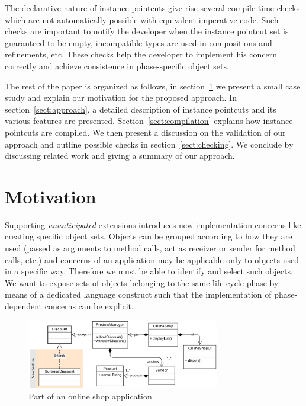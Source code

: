 The declarative nature of instance pointcuts give rise several compile-time checks which are not automatically possible with equivalent imperative code. 
Such checks are important to notify the developer when the instance pointcut set is guaranteed to be empty, incompatible types are used  in compositions and refinements, etc.  These checks help the developer to implement his concern correctly and achieve consistence in phase-specific object sets. 


The rest of the paper is organized as follows, in section~\ref{sect:motivation} we present a small case study and explain our motivation for the proposed approach. In section~\ref{sect:approach}, a detailed description of instance pointcuts and its various features are presented. Section~\ref{sect:compilation} explains how instance pointcuts are compiled. We then present a discussion on the validation of our approach and outline possible checks in section~\ref{sect:checking}. We conclude by discussing related work and giving a summary of our approach.


\section{Motivation}
\label{sect:motivation}
Supporting \emph{unanticipated} extensions introduces new implementation concerns like creating specific object sets.
Objects can be grouped according to how they are used (passed as arguments to method calls, act as receiver or sender for method calls, etc.) and concerns of an application may be applicable only to objects used in a specific way.
Therefore we must be able to identify and select such objects.
We want to expose sets of objects belonging to the same life-cycle phase by means of a dedicated language construct such that the implementation of phase-dependent concerns can be explicit.

\begin{figure}
\centering
\includegraphics[width=0.75\textwidth]{images/aosd2013onlineshop.pdf}%
\vspace{10pt}
\caption{Part of an online shop application}%
\label{fig:shop}%
\end{figure}

